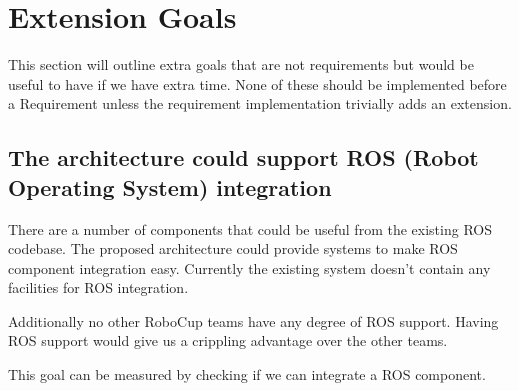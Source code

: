 \documentclass[english,12pt]{scrartcl}
\begin{document}
    \section{Extension Goals}
        This section will outline extra goals that are not requirements but would be useful to have
        if we have extra time. None of these should be implemented before a Requirement unless the
        requirement implementation trivially adds an extension.
        
        \subsection{The architecture could support ROS (Robot Operating System) integration}
            There are a number of components that could be useful from the existing ROS codebase.
            The proposed architecture could provide systems to make ROS component integration easy.
            Currently the existing system doesn't contain any facilities for ROS integration.
            
            Additionally no other RoboCup teams have any degree of ROS support. Having ROS support
            would give us a crippling advantage over the other teams. 
            
            This goal can be measured by checking if we can integrate a ROS component.
            
            
       
    
\end{document}

